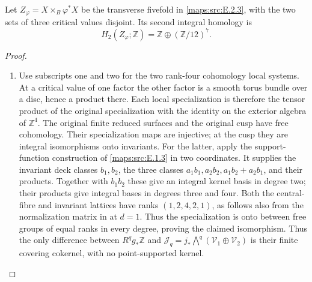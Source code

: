 \begin{proposition}\hypertarget{tag-02MP}{}\label{maps:src:E.2.5}


Let \(Z_\varphi=X\times_B\varphi^*X\) be the transverse
fivefold in \ref{maps:src:E.2.3}, with the two sets of three critical values
disjoint. Its second integral homology is
\[
 H_2(Z_\varphi;\mathbb Z)
   =\mathbb Z\oplus(\mathbb Z/12)^7.
\]
\end{proposition}


\begin{proof}
\begin{enumerate}[label={$\langle1\rangle$\arabic*.},leftmargin=*]
\item Use subscripts one and two for the two rank-four cohomology
local systems. At a critical value of one factor the other
factor is a smooth torus bundle over a disc, hence a product
there. Each local specialization is therefore the tensor
product of the original specialization with the identity on
the exterior algebra of \(\mathbb Z^4\). The original finite
reduced surfaces and the original cusp have free cohomology.
Their specialization maps are injective; at the cusp they
are integral isomorphisms onto invariants. For the latter,
apply the support-function construction of \ref{maps:src:E.1.3} in two
coordinates. It supplies the invariant deck classes
\(b_1,b_2\), the three classes
\(a_1b_1,a_2b_2,a_1b_2+a_2b_1\), and their products.
Together with \(b_1b_2\) these give an integral kernel
basis in degree two; their products give integral bases
in degrees three and four. Both the central-fibre and
invariant lattices have ranks \((1,2,4,2,1)\), as follows
also from the normalization matrix in  at \(d=1\).
Thus the specialization is onto between free groups of
equal ranks in every degree, proving the claimed isomorphism.
Thus the only difference between \(R^qg_*\mathbb Z\) and
\(\mathcal J_q=j_*\bigwedge^q(\mathcal V_1\oplus\mathcal V_2)\)
is their finite covering cokernel, with no point-supported kernel.


\end{enumerate}
\end{proof}
